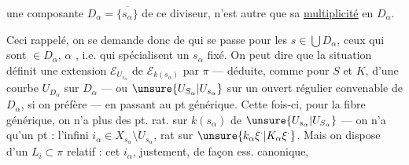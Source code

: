 une composante $D_\alpha=\overline{\{s_\alpha\}}$ de ce diviseur, n'est autre que sa \uline{multiplicité} en $D_\alpha$.

Ceci rappelé, on se demande donc de  qui se passe pour les $s\in\bigcup D_\alpha$,     ceux qui sont $\in D_\alpha$, $\alpha$ , i.e. qui spécialisent un $s_\alpha$ fixé. On peut dire que la situation définit une extension $\mathcal E_{U_{s_\alpha}}$ de $\mathcal E_{k(s_\alpha)}$ par $\pi$ --- déduite, comme  pour $S$ et $K$, d'une courbe  $U_{D_\alpha}$ sur $D_\alpha$ --- ou $\unsure{U_{S_\alpha}|U_{s_\alpha}}$ sur un ouvert régulier convenable de $D_\alpha$, si on préfère --- en passant au pt générique. Cette fois-ci, pour la fibre générique, on n'a plus des  pt. rat. sur $k(s_\alpha)$ de $\unsure{U_{s_\alpha}|U_{S_\alpha}}$ --- on n'a qu'un pt : l'infini $i_\alpha\in X_{s_\alpha}\setminus U_{s_\alpha}$, rat sur $\unsure{k_\alpha\xi^{\cdot}|K_\alpha\xi^{\cdot}}$. Mais on dispose  d'un $L_i\subset\pi$ relatif : cet $i_\alpha$, justement, de façon ess. canonique,
